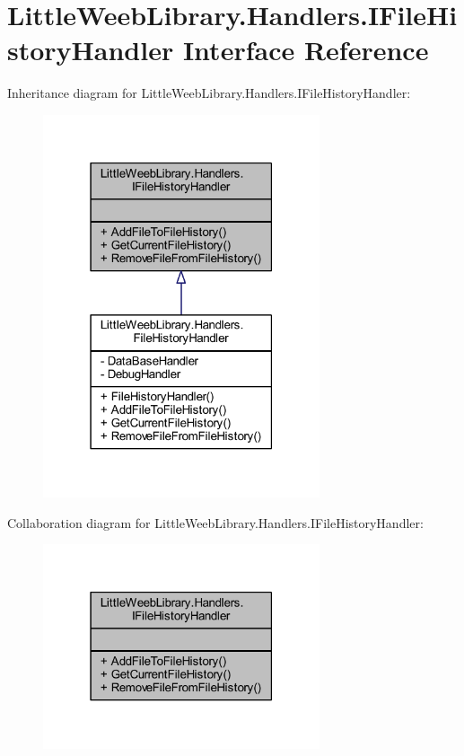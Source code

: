\hypertarget{interface_little_weeb_library_1_1_handlers_1_1_i_file_history_handler}{}\section{Little\+Weeb\+Library.\+Handlers.\+I\+File\+History\+Handler Interface Reference}
\label{interface_little_weeb_library_1_1_handlers_1_1_i_file_history_handler}


Inheritance diagram for Little\+Weeb\+Library.\+Handlers.\+I\+File\+History\+Handler\+:\nopagebreak
\begin{figure}[H]
\begin{center}
\leavevmode
\includegraphics[width=231pt]{interface_little_weeb_library_1_1_handlers_1_1_i_file_history_handler__inherit__graph}
\end{center}
\end{figure}


Collaboration diagram for Little\+Weeb\+Library.\+Handlers.\+I\+File\+History\+Handler\+:\nopagebreak
\begin{figure}[H]
\begin{center}
\leavevmode
\includegraphics[width=231pt]{interface_little_weeb_library_1_1_handlers_1_1_i_file_history_handler__coll__graph}
\end{center}
\end{figure}

